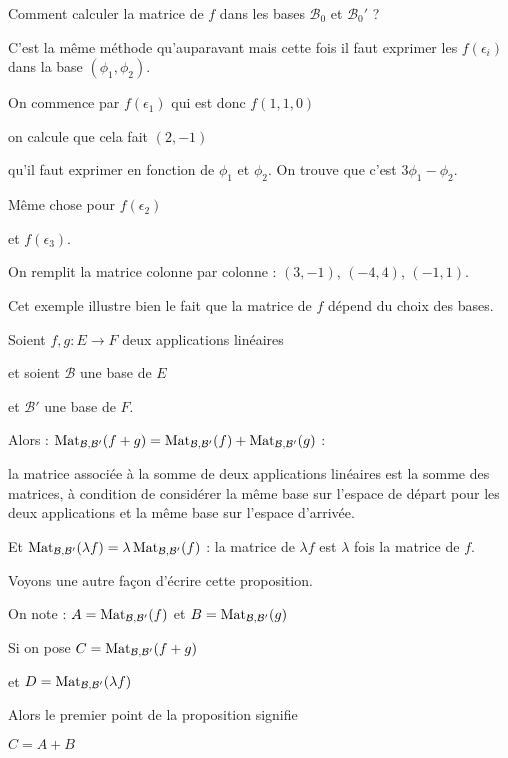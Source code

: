 \change
Comment calculer la matrice de $f$ dans les bases $\mathcal{B}_0$
et $\mathcal{B}_0'$ ?

\change
C'est la même méthode qu'auparavant mais cette fois il faut
exprimer les $f(\epsilon_i)$ dans la base $(\phi_1,\phi_2)$.


On commence par $f(\epsilon_1)$ qui est donc $f(1,1,0)$

\change
on calcule que cela fait $(2,-1)$ 

\change
qu'il faut exprimer en fonction de $\phi_1$ et $\phi_2$.
On trouve que c'est $3\phi_1-\phi_2$.

\change
Même chose pour $f(\epsilon_2)$ 

\change
et $f(\epsilon_3)$.

\change
On remplit la matrice colonne par colonne :
$(3,-1)$, $(-4,4)$, $(-1,1)$.

Cet exemple illustre bien le fait que la matrice de $f$ dépend du choix des
bases.

\diapo

Soient $f,g : E \to F$ deux applications linéaires 

\change
et soient $\mathcal{B}$ une base de $E$ 

\change
et $\mathcal{B}'$ une base de $F$.


\change
Alors :
$\mathop{\mathrm{Mat}}\nolimits_{\mathcal{B},\mathcal{B}'} (f+g) = \mathop{\mathrm{Mat}}\nolimits_{\mathcal{B},\mathcal{B}'} (f)
  + \mathop{\mathrm{Mat}}\nolimits_{\mathcal{B},\mathcal{B}'} (g)$ :
  
la matrice associée à la somme de deux applications linéaires est la
somme des matrices, à condition de considérer la même base sur l'espace de départ 
pour les deux applications et la même base sur l'espace d'arrivée. 

\change
Et $\mathop{\mathrm{Mat}}\nolimits_{\mathcal{B},\mathcal{B}'} ( \lambda f) = \lambda \mathop{\mathrm{Mat}}\nolimits_{\mathcal{B},\mathcal{B}'} (f)$ :
la matrice de $\lambda f$ est $\lambda$ fois la matrice de $f$.

\change
Voyons une autre façon d'écrire cette proposition.

On note : $A = \mathop{\mathrm{Mat}}\nolimits_{\mathcal{B},\mathcal{B}'} (f)$
et  $B = \mathop{\mathrm{Mat}}\nolimits_{\mathcal{B},\mathcal{B}'} (g)$

\change
Si on pose $C = \mathop{\mathrm{Mat}}\nolimits_{\mathcal{B},\mathcal{B}'} (f+g)$

et $D = \mathop{\mathrm{Mat}}\nolimits_{\mathcal{B},\mathcal{B}'} (\lambda f)$

\change
Alors le premier  point de la proposition 
signifie 

$C = A+B$

